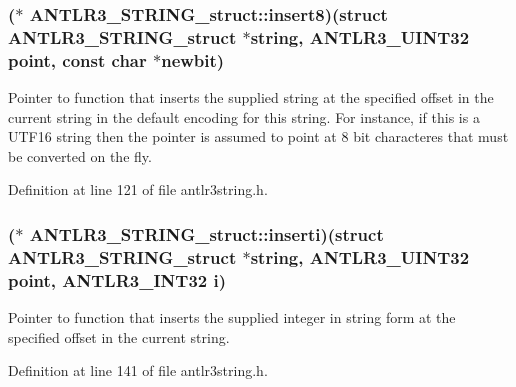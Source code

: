 \hypertarget{struct_a_n_t_l_r3___s_t_r_i_n_g__struct_a0a8591989024d901209c399afed5d576}{
\subsubsection[{insert8}]{($\ast$ A\-N\-T\-L\-R3\-\_\-\-S\-T\-R\-I\-N\-G\-\_\-struct\-::insert8)(struct {\bf A\-N\-T\-L\-R3\-\_\-\-S\-T\-R\-I\-N\-G\-\_\-struct} $\ast$string, {\bf A\-N\-T\-L\-R3\-\_\-\-U\-I\-N\-T32} point, const char $\ast$newbit)}}\label{struct_a_n_t_l_r3___s_t_r_i_n_g__struct_a0a8591989024d901209c399afed5d576}
Pointer to function that inserts the supplied string at the specified offset in the current string in the default encoding for this string. For instance, if this is a U\-T\-F16 string then the pointer is assumed to point at 8 bit characteres that must be converted on the fly. 

Definition at line 121 of file antlr3string.\-h.

\hypertarget{struct_a_n_t_l_r3___s_t_r_i_n_g__struct_a2a3a8531246f1852c5c2774110c41003}{
\subsubsection[{inserti}]{($\ast$ A\-N\-T\-L\-R3\-\_\-\-S\-T\-R\-I\-N\-G\-\_\-struct\-::inserti)(struct {\bf A\-N\-T\-L\-R3\-\_\-\-S\-T\-R\-I\-N\-G\-\_\-struct} $\ast$string, {\bf A\-N\-T\-L\-R3\-\_\-\-U\-I\-N\-T32} point, {\bf A\-N\-T\-L\-R3\-\_\-\-I\-N\-T32} {\bf i})}}\label{struct_a_n_t_l_r3___s_t_r_i_n_g__struct_a2a3a8531246f1852c5c2774110c41003}
Pointer to function that inserts the supplied integer in string form at the specified offset in the current string. 

Definition at line 141 of file antlr3string.\-h.

